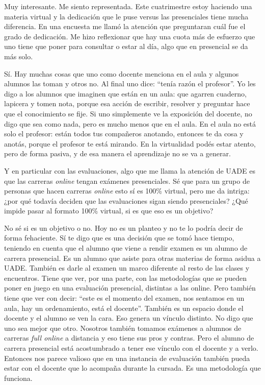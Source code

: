 \begin{description}[leftmargin=0cm, labelsep=0.5cm, style=nextline]
\item[\textbf{Entrevistadores:}] Muy interesante. Me siento representada. Este cuatrimestre estoy haciendo una materia virtual y la dedicación que le puse versus las presenciales tiene mucha diferencia. En una encuesta me llamó la atención que preguntaran cuál fue el grado de dedicación. Me hizo reflexionar que hay una cuota más de esfuerzo que uno tiene que poner para consultar o estar al día, algo que en presencial se da más solo.
\item[\textbf{Entrevistada:}] Sí. Hay muchas cosas que uno como docente menciona en el aula y algunos alumnos las toman y otros no. Al final uno dice: ``tenía razón el profesor''.
Yo les digo a los alumnos que imaginen que están en un aula: que agarren cuaderno, lapicera y tomen nota, porque esa acción de escribir, resolver y preguntar hace que el conocimiento se fije. Si uno simplemente ve la exposición del docente, no digo que sea como nada, pero es mucho menos que en el aula. En el aula no está solo el profesor: están todos tus compañeros anotando, entonces te da cosa y anotás, porque el profesor te está mirando.
En la virtualidad podés estar atento, pero de forma pasiva, y de esa manera el aprendizaje no se va a generar.
\item[\textbf{Entrevistadores:}] Y en particular con las evaluaciones, algo que me llama la atención de UADE es que las carreras \textit{online} tengan exámenes presenciales. Sé que para un grupo de personas que hacen carreras \textit{online} esto sí es 100\% virtual, pero me da intriga: ¿por qué todavía deciden que las evaluaciones sigan siendo presenciales? ¿Qué impide pasar al formato 100\% virtual, si es que eso es un objetivo?
\item[\textbf{Entrevistada:}] No sé si es un objetivo o no. Hoy no es un planteo y no te lo podría decir de forma fehaciente.
Sí te digo que es una decisión que se tomó hace tiempo, teniendo en cuenta que el alumno que viene a rendir examen es un alumno de carrera presencial. Es un alumno que asiste para otras materias de forma asidua a UADE. También es darle al examen un marco diferente al resto de las clases y encuentros.
Tiene que ver, por una parte, con las metodologías que se pueden poner en juego en una evaluación presencial, distintas a las online. Pero también tiene que ver con decir: ``este es el momento del examen, nos sentamos en un aula, hay un ordenamiento, está el docente''. También es un espacio donde el docente y el alumno se ven la cara. Eso genera un vínculo distinto.
No digo que uno sea mejor que otro. Nosotros también tomamos exámenes a alumnos de carreras \textit{full online} a distancia y eso tiene sus pros y contras. Pero el alumno de carrera presencial está acostumbrado a tener ese vínculo con el docente y a verlo. Entonces nos parece valioso que en una instancia de evaluación también pueda estar con el docente que lo acompaña durante la cursada. Es una metodología que funciona.

\end{description}

